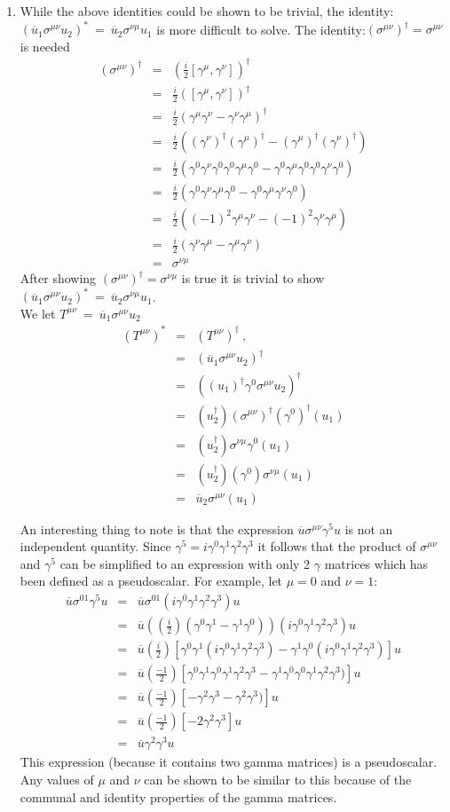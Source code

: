 \documentclass[12pt]{article}
\def \bea{\begin{eqnarray}}
\def \eea{\end{eqnarray}}
\def \ou{\overline{u}}
\def \ga{\gamma}
\def \si{\sigma}
\begin{document}
\begin{enumerate}
\item  While the above identities could be shown to be trivial, the identity: $(\ou_1 \si^{\mu\nu} u_2)^* ~=~\ou_2 \si^{\nu\mu} u_1$ is more difficult to solve. The identity:$(\si^{\mu\nu})^\dag =\si^{\mu\nu}$ is needed
\bea
(\si^{\mu\nu})^\dag &=& (\frac{i}{2}[\ga^\mu,\ga^\nu])^\dag \\
&=& \frac{i}{2}([\ga^\mu,\ga^\nu])^\dag\\
&=& \frac{i}{2}(\ga^\mu\ga^\nu-\ga^\nu\ga^\mu)^\dag \\
&=& \frac{i}{2}((\ga^\nu)^\dag(\ga^\mu)^\dag-(\ga^\mu)^\dag(\ga^\nu)^\dag) \\
&=& \frac{i}{2}(\ga^0\ga^\nu\ga^0\ga^0\ga^\mu\ga^0-\ga^0\ga^\mu\ga^0\ga^0\ga^\nu\ga^0)\\
&=& \frac{i}{2}(\ga^0\ga^\nu\ga^\mu\ga^0-\ga^0\ga^\mu \ga^\nu\ga^0)\\
&=& \frac{i}{2}((-1)^2\ga^\mu\ga^\nu-(-1)^2\ga^\nu \ga^\mu) \\
&=& \frac{i}{2}(\ga^\nu\ga^\mu-\ga^\mu \ga^\nu)\\
&=& \si^{\nu\mu}
\eea
After showing $(\si^{\mu\nu})^\dag =\si^{\nu\mu}$ is true it is trivial to show $(\ou_1 \si^{\mu\nu} u_2)^* ~=~\ou_2 \si^{\nu\mu} u_1$.\\
We let $T^{\mu\nu} ~=~ \ou_1 \si^{\mu\nu} u_2$
\bea
(T^{\mu\nu})^* &=& (T^{\mu\nu})^\dag ~,~~ \\
&=& (\ou_1 \si^{\mu\nu} u_2)^\dag \\
&=& ((u_1)^\dag \ga^0 \si^{\mu\nu} u_2)^\dag \\
&=& (u_2^\dag)(\si^{\mu\nu})^\dag (\ga^0)^\dag(u_1)\\
&=& (u_2^\dag)\si^{\nu\mu}\ga^0(u_1)\\
&=& (u_2^\dag)(\ga^0)\si^{\nu\mu}(u_1)\\
&=& \ou_2 \si^{\mu\nu}(u_1)
\eea


An interesting thing to note is that the expression $\ou \si^{\mu\nu} \ga^5 u$ is not an independent quantity. Since $\ga^5 =i\ga^0\ga^1\ga^2\ga^3$ it follows that the product of $\si^{\mu\nu}$ and $\ga^5$ can be simplified to an expression with only 2 $\ga$ matrices which has been defined as a pseudoscalar. For example, let $\mu =0$ and $\nu=1$:
\bea
\ou \si^{01} \ga^5 u &=& \ou \si^{01} (i\ga^0\ga^1\ga^2\ga^3) u \\
&=&  \ou ((\frac{i}{2})(\ga^0\ga^1 -\ga^1\ga^0)) (i\ga^0\ga^1\ga^2\ga^3) u \\
&=&  \ou (\frac{i}{2})[\ga^0\ga^1(i\ga^0\ga^1\ga^2\ga^3) -\ga^1\ga^0(i\ga^0\ga^1\ga^2\ga^3)] u \\
&=&  \ou (\frac{-1}{2})[\ga^0\ga^1\ga^0\ga^1\ga^2\ga^3 -\ga^1\ga^0\ga^0\ga^1\ga^2\ga^3)] u \\
&=& \ou (\frac{-1}{2})[-\ga^2\ga^3 -\ga^2\ga^3)] u\\
&=& \ou (\frac{-1}{2})[-2\ga^2\ga^3] u\\
&=& \ou \ga^2\ga^3 u
\eea
This expression (because it contains two gamma matrices) is a pseudoscalar. Any values of $\mu$ and $\nu$ can be shown to be similar to this because of the communal and identity properties of the gamma matrices.


\end{enumerate}
\end{document}
